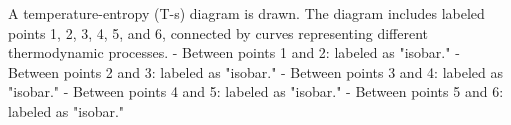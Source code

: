 A temperature-entropy (T-s) diagram is drawn. The diagram includes labeled points 1, 2, 3, 4, 5, and 6, connected by curves representing different thermodynamic processes.  
- Between points 1 and 2: labeled as "isobar."  
- Between points 2 and 3: labeled as "isobar."  
- Between points 3 and 4: labeled as "isobar."  
- Between points 4 and 5: labeled as "isobar."  
- Between points 5 and 6: labeled as "isobar."